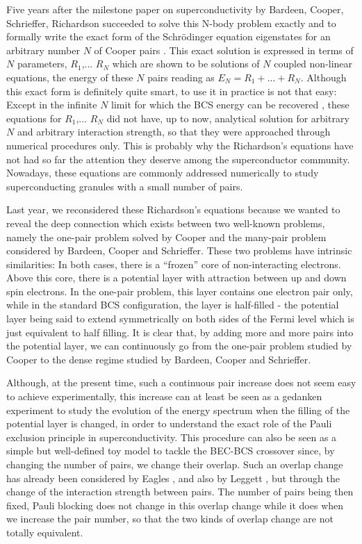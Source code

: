 \documentclass[aps,prb,superscriptaddress,showpacs,reprint,lengthcheck]{revtex4-1}
\begin{document}
Five years after the milestone paper on superconductivity by Bardeen,
Cooper, Schrieffer\cite{BCS}, Richardson succeeded to solve this N-body problem exactly and to formally write
the exact form of the Schr\"{o}dinger equation eigenstates for an arbitrary number $N$ of Cooper pairs%
\cite{Richardson1,Richardson2}. This exact solution is expressed in terms
of $N$ parameters, $R_{1}$,... $R_{N}$ which are shown to be solutions of $N$ coupled
non-linear equations, the energy of these $N$ pairs reading as $E
_{N}=R_{1}+...+R_{N}$. Although this exact form is definitely quite smart, to
use it in practice is not that easy: Except in the infinite $N$ limit for which the BCS energy can be recovered \cite{Richardson3}, these equations for $R_{1}$,... $R_{N}$  did not have, up to now, analytical solution for arbitrary $N$ and arbitrary interaction strength, so that they were approached through
numerical procedures\cite{Duk,delft} only. This is probably why the Richardson's equations have not had so far the
attention they deserve among the superconductor community. Nowadays, these equations 
are commonly addressed numerically to study superconducting granules with a small number of pairs\cite{Duk}.

Last year, we reconsidered these Richardson's equations because we wanted to reveal the deep connection which exists between two well-known problems, namely the
one-pair problem solved by Cooper and the many-pair problem considered by Bardeen, Cooper and Schrieffer. 
These two problems have intrinsic similarities: In
both cases, there is a ``frozen'' core of non-interacting electrons. Above this core, there is
a potential layer with attraction between up and
down spin electrons. In the one-pair problem, this layer contains one electron pair 
only, while in the standard BCS configuration, the
layer is half-filled - the potential layer being said to extend symmetrically 
on both sides of the Fermi level which is just equivalent to half filling.
It is clear that, by adding more and more pairs into the potential layer, we can 
continuously go from the one-pair problem studied by Cooper to the dense regime studied by Bardeen, Cooper and Schrieffer. 

Although, at the present time, such a continuous pair increase
does not seem easy to achieve experimentally, this increase can at least be seen as a 
gedanken experiment to study the evolution of the energy spectrum when
the filling of the potential layer is changed, in order to understand the exact role of the Pauli
exclusion principle in superconductivity. 
This procedure can also be
seen as a simple but well-defined toy model to tackle the BEC-BCS crossover
since, by changing the number of pairs, we change their overlap. 
Such an overlap change has already been considered by Eagles \cite{Eagle}, 
and also by Leggett \cite{LeggettCrossover}, but through the change of the interaction strength between pairs. The number of pairs being then fixed, Pauli blocking does not change in this overlap change while it does when we increase the pair number, so that the two kinds of overlap change are not totally equivalent.
\end{document}
